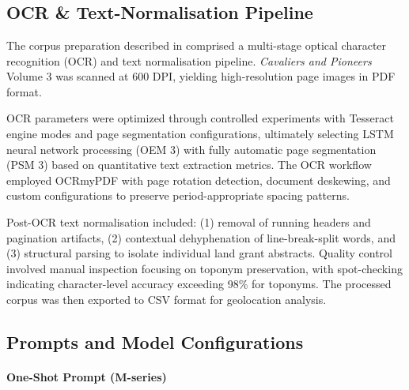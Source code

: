 \DIFdelbegin {}%

\DIFdelend \DIFaddbegin \appendix\section{}\DIFaddend \label{appendix-a-supplementary-methods-materials}

\subsection{OCR \& Text-Normalisation
Pipeline}\label{a.1-ocr-text-normalisation-pipeline}

The corpus preparation described in \DIFdelbegin {}\DIFdelend \DIFaddbegin {} comprised a multi-stage
optical character recognition (OCR) and text normalisation pipeline.
\emph{Cavaliers and Pioneers} Volume 3 was scanned at 600 DPI, yielding
high-resolution page images in PDF format.

OCR parameters were optimized through controlled experiments with
Tesseract engine modes and page segmentation configurations, ultimately
selecting LSTM neural network processing (OEM 3) with fully automatic
page segmentation (PSM 3) based on quantitative text extraction metrics.
The OCR workflow employed OCRmyPDF with page rotation detection,
document deskewing, and custom configurations to preserve
period-appropriate spacing patterns.

Post-OCR text normalisation included: (1) removal of running headers and
pagination artifacts, (2) contextual dehyphenation of line-break-split
words, and (3) structural parsing to isolate individual land grant
abstracts. Quality control involved manual inspection focusing on
toponym preservation, with spot-checking indicating character-level
accuracy exceeding 98\% for toponyms. The processed corpus was then
exported to CSV format for geolocation analysis.

\subsection{Prompts and Model Configurations}\label{sec:prompts}

\paragraph{One-Shot Prompt
(M-series)}\label{a.2.1-one-shot-prompt-m-series}

